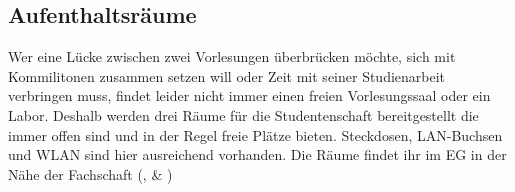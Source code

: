 \subsection{Aufenthaltsräume}
Wer eine Lücke zwischen zwei Vorlesungen 
überbrücken möchte, sich mit Kommilitonen 
zusammen setzen will oder Zeit mit seiner 
Studienarbeit verbringen muss, findet leider nicht 
immer einen freien Vorlesungssaal oder ein Labor. 
Deshalb werden drei Räume für die Studentenschaft bereitgestellt die 
immer offen sind und in der Regel freie Plätze bieten. Steckdosen, LAN-Buchsen und WLAN sind hier ausreichend vorhanden. Die Räume findet 
ihr im EG in der Nähe der Fachschaft (,  \& )
